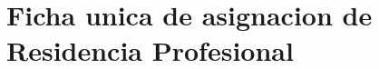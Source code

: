 \section{Ficha unica de asignacion de Residencia Profesional}\label{ch:ficha}
\thispagestyle{empty}
\newpage
